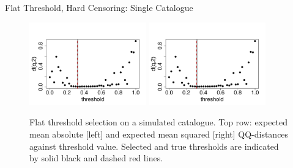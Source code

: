 \begin{frame}{Flat Threshold, Hard Censoring:  Single Catalogue}
    \begin{figure}
    \centering
    \includegraphics[width = 0.45\textwidth, page = 2]{images/flat_threshold_sim/qq_metrics.pdf}
    \includegraphics[width = 0.45\textwidth, page = 1]{images/flat_threshold_sim/qq_metrics.pdf} 
    \caption{Flat threshold selection on a simulated catalogue. Top row: expected mean absolute [left] and expected mean squared [right] QQ-distances against threshold value.  Selected and true thresholds are indicated by solid black and dashed red lines.}
    \label{fig:flat_threhsold_sim}
\end{figure} 
\end{frame}

